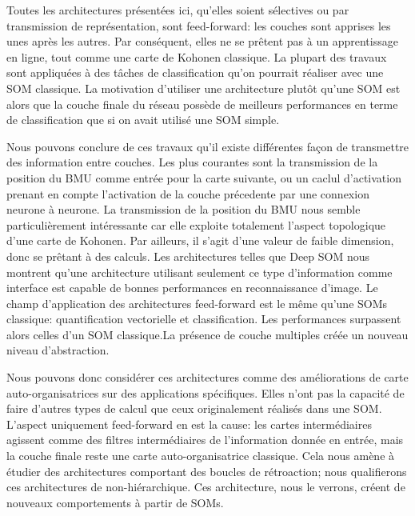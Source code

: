 \documentclass[../main]{subfiles}
\begin{document}
Toutes les architectures présentées ici, qu'elles soient sélectives ou par transmission de représentation, sont feed-forward: les couches sont apprises les unes après les autres. Par conséquent, elles ne se prêtent pas à un apprentissage en ligne, tout comme une carte de Kohonen classique.
La plupart des travaux sont appliquées à des tâches de classification qu'on pourrait réaliser avec une SOM classique.
La motivation d'utiliser une architecture plutôt qu'une SOM est alors que la couche finale du réseau possède de meilleurs performances en terme de classification que si on avait utilisé une SOM simple.


Nous pouvons conclure de ces travaux qu'il existe différentes façon de transmettre des information entre couches. Les plus courantes sont la transmission de la position du BMU comme entrée pour la carte suivante, ou un caclul d'activation prenant en compte l'activation de la couche précedente par une connexion neurone à neurone.
La transmission de la position du BMU nous semble particulièrement intéressante car elle exploite totalement l'aspect topologique d'une carte de Kohonen. Par ailleurs, il s'agit d'une valeur de faible dimension, donc se prêtant à des calculs. Les architectures telles que Deep SOM nous montrent qu'une architecture utilisant seulement ce type d'information comme interface est capable de bonnes performances en reconnaissance d'image.
Le champ d'application des architectures feed-forward est le même qu'une SOMs classique: quantification vectorielle et classification. Les performances surpassent alors celles d'un SOM classique.La présence de couche multiples créée un nouveau niveau d'abstraction.

Nous pouvons donc considérer ces architectures comme des améliorations de carte auto-organisatrices sur des applications spécifiques. Elles n'ont pas la capacité de faire d'autres types de calcul que ceux originalement réalisés dans une SOM. L'aspect uniquement feed-forward en est la cause: les cartes intermédiaires agissent comme des filtres intermédiaires de l'information donnée en entrée, mais la couche finale reste une carte auto-organisatrice classique.
Cela nous amène à étudier des architectures comportant des boucles de rétroaction; nous qualifierons ces architectures de non-hiérarchique. Ces architecture, nous le verrons, créent de nouveaux comportements à partir de SOMs.
\end{document}
